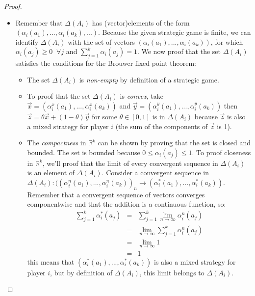 \documentclass[a4paper,11pt]{article}
\newcommand{\R}{{\mathbb R}}
\begin{document}
\begin{proof}
\begin{itemize}
  \item Remember that $\Delta(A_i)$ has (vector)elements of the form $(\alpha_i(a_1),...,\alpha_i(a_k),...)$. Because the given strategic game is finite, we can identify $\Delta(A_i)$ with the set of vectors $(\alpha_i(a_1),...,\alpha_i(a_k))$, for which $\alpha_i(a_j) \geq 0 \;\; \forall j$ and $\sum^k_{j=1}{\alpha_i(a_j)} = 1$. We now proof that the set $\Delta(A_i)$ satisfies the conditions for the Brouwer fixed point theorem:
      \begin{itemize}
        \item The set $\Delta(A_i)$ is \emph{non-empty} by definition of a strategic game.
        \item To proof that the set $\Delta(A_i)$ is \emph{convex}, take $\vec{x} = (\alpha^x_i(a_1),...,\alpha^x_i(a_k))$ and $\vec{y} = (\alpha^y_i(a_1),...,\alpha^y_i(a_k))$ then $\vec{z} = \theta\vec{x} + (1 - \theta)\vec{y}$ for some $\theta \in [0,1]$ is in $\Delta(A_i)$ because $\vec{z}$ is also a mixed strategy for player $i$ (the sum of the components of $\vec{z}$ is 1).
        \item  The \emph{compactness} in $\R^k$ can be shown by proving that the set is closed and bounded. The set is bounded because $0 \leq \alpha_i(a_j) \leq 1$. To proof closeness in $\R^k$, we'll proof that the limit of every convergent sequence in $\Delta(A_i)$ is an element of $\Delta(A_i)$. Consider a convergent sequence in $\Delta(A_i): ((\alpha^n_i(a_1),...,\alpha^n_i(a_k))_n\rightarrow(\alpha^*_i(a_1),...,\alpha^*_i(a_k))$. Remember that a convergent sequence of vectors converges componentwise and that the addition is a continuous function, so:
            \begin{eqnarray*}
              \sum_{j=1}^k{\alpha^*_i(a_j)}  &=& \displaystyle\sum_{j=1}^k{\lim_{n\rightarrow\infty}{\alpha^n_i(a_j)}}\\
              &=& \displaystyle\lim_{n\rightarrow\infty}{\sum_{j=1}^k\alpha^n_i(a_j)}\\
              &=& \displaystyle\lim_{n\rightarrow\infty}{1}\\
              &=& 1
            \end{eqnarray*}
            this means that $(\alpha^*_i(a_1),...,\alpha^*_i(a_k))$ is also a mixed strategy for player $i$, but by definition of $\Delta(A_i)$, this limit belongs to $\Delta(A_i)$.
      \end{itemize}

\end{itemize}


\end{proof}
\end{document}
